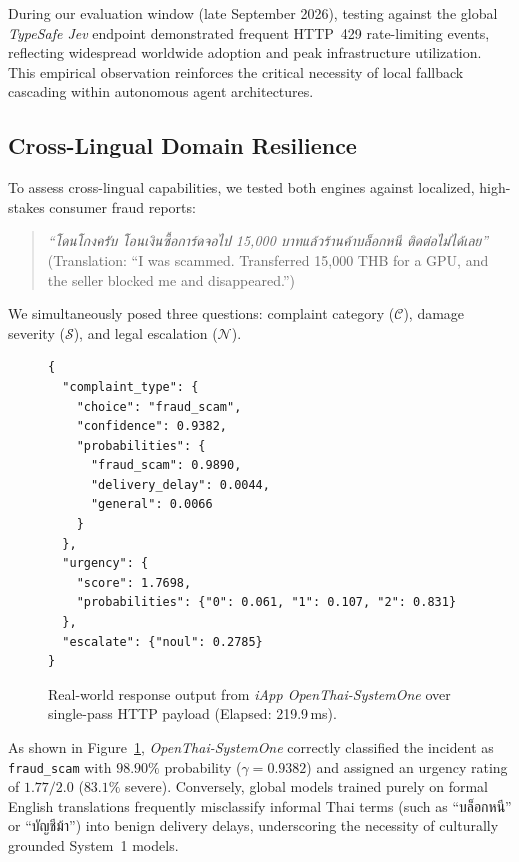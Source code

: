\documentclass[10pt,twocolumn,letterpaper]{article}
\newcommand{\thaifont}{}
\begin{document}
During our evaluation window (late September 2026), testing against the global \textit{TypeSafe Jev} endpoint demonstrated frequent HTTP~429 rate-limiting events, reflecting widespread worldwide adoption and peak infrastructure utilization. This empirical observation reinforces the critical necessity of local fallback cascading within autonomous agent architectures.

\subsection{Cross-Lingual Domain Resilience}
To assess cross-lingual capabilities, we tested both engines against localized, high-stakes consumer fraud reports:
\begin{quote}
\textit{``{\thaifont โดนโกงครับ โอนเงินซื้อการ์ดจอไป} 15,000 {\thaifont บาทแล้วร้านค้าบล็อกหนี ติดต่อไม่ได้เลย}''} (Translation: ``I was scammed. Transferred 15,000 THB for a GPU, and the seller blocked me and disappeared.'')
\end{quote}
We simultaneously posed three questions: complaint category ($\mathcal{C}$), damage severity ($\mathcal{S}$), and legal escalation ($\mathcal{N}$).

\begin{figure}[t]
\centering
\begin{lstlisting}
{
  "complaint_type": {
    "choice": "fraud_scam",
    "confidence": 0.9382,
    "probabilities": {
      "fraud_scam": 0.9890,
      "delivery_delay": 0.0044,
      "general": 0.0066
    }
  },
  "urgency": {
    "score": 1.7698,
    "probabilities": {"0": 0.061, "1": 0.107, "2": 0.831}
  },
  "escalate": {"noul": 0.2785}
}
\end{lstlisting}
\caption{Real-world response output from \textit{iApp OpenThai-SystemOne} over single-pass HTTP payload (Elapsed: 219.9\,ms).}
\label{fig:live_response}
\end{figure}

As shown in Figure~\ref{fig:live_response}, \textit{OpenThai-SystemOne} correctly classified the incident as \texttt{fraud\_scam} with $98.90\%$ probability ($\gamma = 0.9382$) and assigned an urgency rating of $1.77 / 2.0$ ($83.1\%$ severe). Conversely, global models trained purely on formal English translations frequently misclassify informal Thai terms (such as ``{\thaifont บล็อกหนี}'' or ``{\thaifont บัญชีม้า}'') into benign delivery delays, underscoring the necessity of culturally grounded System~1 models.
\end{document}
